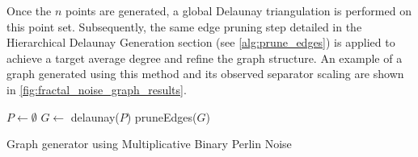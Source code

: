 Once the \(n\) points are generated, a global Delaunay triangulation is performed on this point set. Subsequently, the same edge pruning step detailed in the Hierarchical Delaunay Generation section (see \cref{alg:prune_edges}) is applied to achieve a target average degree and refine the graph structure.
An example of a graph generated using this method and its observed separator scaling are shown in \cref{fig:fractal_noise_graph_results}.

\begin{algorithm}[tbhp]
	\BlankLine
	\(P \longleftarrow \emptyset\)\;
	\(G \longleftarrow\) delaunay(\(P\))\;
	pruneEdges(\(G\))\;
	\;
	\caption{Graph generator using Multiplicative Binary Perlin Noise}
	\label{alg:fractal_noise_point_sampling}
\end{algorithm}


